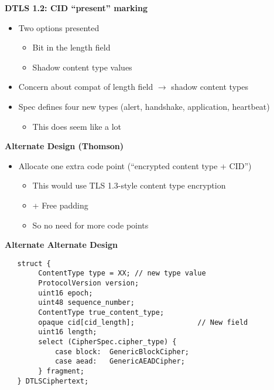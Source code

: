 \documentclass[helvetica]{seminar}
\newcommand{\heading}[1]{%
  \begin{center} 
    \large\bf 
    #1 
  \end{center} 
  \vspace{.4 in}}
\begin{document}
\begin{slide}
  \heading{DTLS 1.2: CID ``present'' marking}

  \begin{itemize}
  \item Two options presented
    \begin{itemize}
    \item Bit in the length field
    \item Shadow content type values
    \end{itemize}

  \item Concern about compat of length field $\rightarrow$ shadow content types
  \item Spec defines four new types (alert, handshake, application, heartbeat)
    \begin{itemize}
    \item This does seem like a lot
    \end{itemize}
  \end{itemize}
\end{slide}

\begin{slide}
  \heading{Alternate Design (Thomson)}

  \begin{itemize}
  \item Allocate one extra code point (``encrypted content type + CID'')
    \begin{itemize}
    \item This would use TLS 1.3-style content type encryption
    \item + Free padding
    \item So no need for more code points
    \end{itemize}    
  \end{itemize}
\end{slide}

\begin{slide}
  \heading{Alternate Alternate Design}

\begin{verbatim}
   struct {
        ContentType type = XX; // new type value
        ProtocolVersion version;
        uint16 epoch;
        uint48 sequence_number;
        ContentType true_content_type;
        opaque cid[cid_length];               // New field
        uint16 length;
        select (CipherSpec.cipher_type) {
            case block:  GenericBlockCipher;
            case aead:   GenericAEADCipher;
        } fragment;
   } DTLSCiphertext;
\end{verbatim}  
\end{slide}
\end{document}

